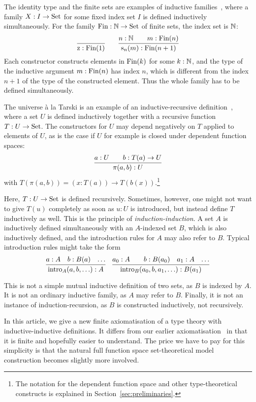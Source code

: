 \documentclass{article}
\begin{document}
The identity type and the finite sets are examples
of inductive families~\cite{dybjer1994indfam}, where a family $X : I
\to \text{Set}$ for some fixed index set $I$ is defined inductively
simultaneously. For the family $\text{Fin} : \mathbb{N} \to \text{Set}$ of finite sets,
the index set is $\mathbb{N}$:
\[
\infer{\finzero : \Fin(1)}{} \qquad
\infer{\finsucc{n}{m} : \Fin(n + 1)}{n : \Nat & \quad m : \Fin(n)}
\]
Each constructor constructs elements in $\text{Fin}(k)$ for some $k : \mathbb{N}$,
and the type of the inductive argument $m : \text{Fin}(n)$ has index $n$,
which is different from the index $n + 1$ of the type of the
constructed element. Thus the whole family has to be defined
simultaneously.

The universe \`a la Tarski is an example of an inductive-recursive
definition~\cite{dybjer2000IR}, where a set $U$ is defined inductively
together with a recursive function $T : U \to \text{Set}$.  The constructors
for $U$ may depend negatively on $T$ applied to elements of $U$, as is
the case if $U$ for example is closed under dependent function spaces:
\[
\infer{\pi(a, b) : U}{a : U & \quad b : T(a) \to U}
\]
with $T(\pi(a, b)) = (x : T(a)) \to T(b(x))$.\footnote{The notation
  for the dependent function space and other type-theoretical
  constructs is explained in Section~\ref{sec:preliminaries}.}

Here, $T : U \to \text{Set}$ is defined recursively. Sometimes, however, one
might not want to give $T(u)$ completely as soon as $u : U$ is
introduced, but instead define $T$ inductively as well. This is the
principle of \emph{induction-induction}. A set $A$ is inductively
defined simultaneously with an $A$-indexed set $B$, which is also
inductively defined, and the introduction rules for $A$ may also refer
to $B$. Typical introduction rules might take the form
\[ \infer{\text{intro}_A(a, b, \ldots) : A}{a : A &b : B(a) & \ldots} \quad
\infer{\text{intro}_B(a_0, b, a_1, \ldots) : B(a_1)}{a_0 : A &
&b : B(a_0) & a_1 : A & \ldots} \]

This is not a simple mutual inductive definition of two sets, as $B$
is indexed by $A$. It is not an ordinary inductive family, as $A$ may
refer to $B$. Finally, it is not an instance of induction-recursion,
as $B$ is constructed inductively, not recursively.

In this article, we give a new finite axiomatisation of a type theory
with inductive-inductive definitions. It differs from our earlier
axiomatisation~\cite{nordvallforsbergSetzer2010indind} in that it is
finite and hopefully easier to understand. The price we have to pay
for this simplicity is that the natural full function space
set-theoretical model construction becomes slightly more involved.
\end{document}

